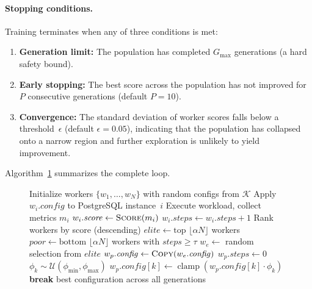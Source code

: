 \paragraph{Stopping conditions.}
Training terminates when any of three conditions is met:
\begin{enumerate}
  \item \textbf{Generation limit:} The population has completed
    $G_{\max}$ generations (a hard safety bound).
  \item \textbf{Early stopping:} The best score across the population has
    not improved for $P$ consecutive generations (default $P = 10$).
  \item \textbf{Convergence:} The standard deviation of worker scores
    falls below a threshold~$\epsilon$ (default $\epsilon = 0.05$),
    indicating that the population has collapsed onto a narrow region and
    further exploration is unlikely to yield improvement.
\end{enumerate}

Algorithm~\ref{alg:pbt} summarizes the complete loop.

\begin{figure}[t]
\begin{minipage}{\columnwidth}
\small
\begin{algorithmic}[1]
  \State Initialize workers $\{w_1, \ldots, w_N\}$ with random configs
    from $\mathcal{K}$
      \State Apply $w_i.\mathit{config}$ to PostgreSQL instance~$i$
      \State Execute workload, collect metrics $m_i$
      \State $w_i.\mathit{score} \gets \textsc{Score}(m_i)$
      \State $w_i.\mathit{steps} \gets w_i.\mathit{steps} + 1$
    \EndFor
    \State Rank workers by score (descending)
    \State $\mathit{elite} \gets \text{top } \lfloor \alpha N \rfloor$
      workers
    \State $\mathit{poor} \gets \text{bottom } \lfloor \alpha N \rfloor$
      workers with $\mathit{steps} \geq \tau$
      \State $w_e \gets$ random selection from $\mathit{elite}$
      \State $w_p.\mathit{config} \gets \textsc{Copy}(w_e.\mathit{config})$
      \State $w_p.\mathit{steps} \gets 0$
        \State $\phi_k \sim \mathcal{U}(\phi_{\min}, \phi_{\max})$
        \State $w_p.\mathit{config}[k] \gets
          \operatorname{clamp}(w_p.\mathit{config}[k] \cdot \phi_k)$
      \EndFor
    \EndFor
      \State \textbf{break}
    \EndIf
  \EndFor
  \State \Return best configuration across all generations
\end{algorithmic}
\end{minipage}
\label{alg:pbt}
\end{figure}

